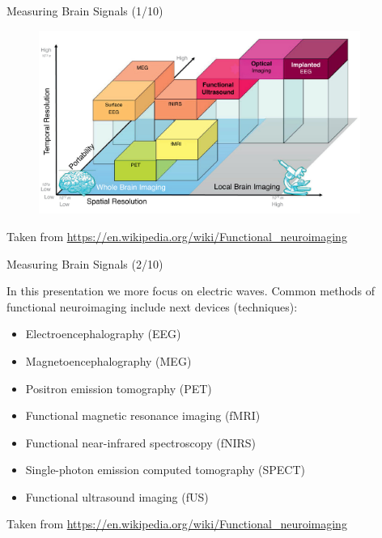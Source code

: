 \documentclass{beamer}
\begin{document}
\begin{frame}
{\centerline{Measuring Brain Signals (1/10)}}
    \begin{figure}
        \centering
        \includegraphics[height=6cm]{P2023.AIBCCSS.BrainSignals/1920px-Main_brain_functional_imaging_technique_resolutions.svg.png}
    \end{figure}
    \begin{center}
    \tiny{Taken from \url{https://en.wikipedia.org/wiki/Functional_neuroimaging}}
    \end{center} 
\end{frame}

\begin{frame}
{\centerline{Measuring Brain Signals (2/10)}}
In this presentation we more focus on electric waves. Common methods of functional neuroimaging include next devices (techniques):
\begin{itemize}
    \item Electroencephalography (EEG)
    \item Magnetoencephalography (MEG)
    \item Positron emission tomography (PET)
    \item Functional magnetic resonance imaging (fMRI)
    \item Functional near-infrared spectroscopy (fNIRS)
    \item Single-photon emission computed tomography (SPECT)
    \item Functional ultrasound imaging (fUS)
\end{itemize}
   \begin{center}
    \tiny{Taken from \url{https://en.wikipedia.org/wiki/Functional_neuroimaging}}
    \end{center} 
\end{frame}
\end{document}
